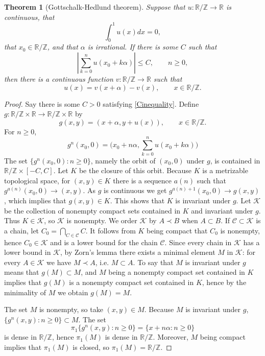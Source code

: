 \documentclass{article}
\newtheorem{theorem}{Theorem}
\theoremstyle{definition}
\begin{document}
\begin{theorem}[Gottschalk-Hedlund theorem]
Suppose that $u:\mathbb{R}/\mathbb{Z} \to \mathbb{R}$ is continuous, that 
\[
\int_0^1 u(x) dx =0,
\]
that $x_0 \in \mathbb{R} / \mathbb{Z}$, and that $\alpha$ is irrational. If there is some $C$ such that
\begin{equation}
\left| \sum_{k=0}^n u(x_0+k\alpha) \right| \leq C, \qquad n \geq 0,
\label{Cinequality}
\end{equation}
then there is  a continuous function  $v:\mathbb{R}/\mathbb{Z} \to \mathbb{R}$ such that
\[
u(x)=v(x+\alpha)-v(x), \qquad x \in \mathbb{R}/\mathbb{Z}.
\]
\end{theorem}
\begin{proof}
Say there is some $C>0$ satisfying \eqref{Cinequality}. Define $g:\mathbb{R}/\mathbb{Z} \times \mathbb{R} \to \mathbb{R}/\mathbb{Z} \times \mathbb{R}$
by 
\[
g(x,y) = (x+\alpha,y+u(x)), \qquad x \in \mathbb{R} / \mathbb{Z}.
\]
For $n \geq 0$,
\[
g^n(x_0,0)=\Big(x_0+n\alpha,\sum_{k=0}^n u(x_0+k\alpha) \Big)
\]
The set $\{g^n(x_0,0): n \geq 0\}$, namely the orbit of $(x_0,0)$ under $g$, is contained in $\mathbb{R} / \mathbb{Z} \times [-C,C]$. 
Let $K$ be the closure of this orbit. 
Because $K$ is a metrizable topological space, for $(x,y) \in K$  there is a sequence $a(n)$ such that $g^{a(n)}(x_0,0) \to (x,y)$. As $g$ is continuous we get 
$g^{a(n)+1}(x_0,0) \to g(x,y)$, which implies that $g(x,y) \in K$. This shows that $K$ is invariant under $g$. Let $\mathscr{K}$ be the collection of nonempty compact
sets contained in $K$ and invariant under $g$. Thus $K \in \mathscr{K}$, so $\mathscr{K}$ is nonempty. We order $\mathscr{K}$ by $A \prec B$ when
$A \subset B$. If $\mathscr{C} \subset \mathscr{K}$ is a chain, let $C_0=\bigcap_{C \in \mathscr{C}} C$. It follows from $K$ being compact that $C_0$ is nonempty,
hence $C_0 \in \mathscr{K}$ and is a lower bound for the chain $\mathscr{C}$. Since every chain in $\mathscr{K}$ has a lower bound in $\mathscr{K}$,
by Zorn's lemma there exists a minimal element $M$ in $\mathscr{K}$: for every $A \in \mathscr{K}$ we have $M \prec A$, i.e. $M \subset A$. 
To say that $M$ is invariant under $g$ means that $g(M) \subset M$, and $M$ being a nonempty compact set contained in $K$ implies that
$g(M)$ is a nonempty compact set contained in $K$, hence by the minimality of $M$ we obtain $g(M)=M$.


The set $M$ is nonempty, so take $(x,y) \in M$. Because
$M$ is invariant under $g$,
$\{g^n(x,y): n \geq 0\} \subset M$.
The set
\[
\pi_1 \{g^n(x,y): n \geq 0\} = \{ x+n\alpha: n \geq 0\}
\]
 is dense in $\mathbb{R} / \mathbb{Z}$, hence $\pi_1(M)$ is dense in $\mathbb{R} / \mathbb{Z}$. Moreover,
  $M$ being compact implies that $\pi_1(M)$ is closed, so $\pi_1(M)=\mathbb{R}/\mathbb{Z}$. 
 

\end{proof}
\end{document}
